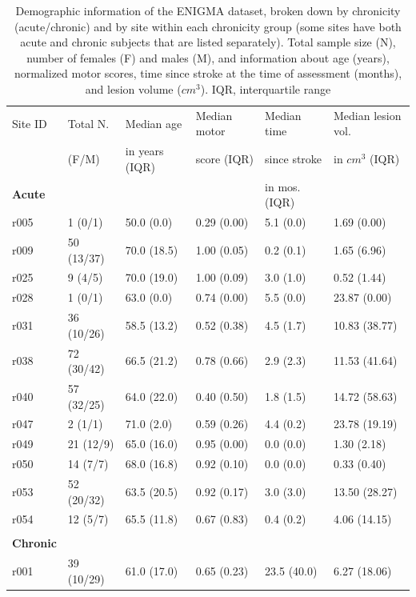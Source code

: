 \documentclass[10pt]{article}
\begin{document}
\newpage
\begin{table}[h]
\centering
\caption{Demographic information of the ENIGMA dataset, broken down by chronicity (acute/chronic) and by site within each chronicity group (some sites have both acute and chronic subjects that are listed separately). Total sample size (N), number of females (F) and males (M), and information about age (years), normalized motor scores, time since stroke at the time of assessment (months), and lesion volume ($cm^3$). IQR, interquartile range}

\label{table:Demographics}
\begin{tabular}{llllll}
\toprule
Site ID & Total N. & Median age & Median motor  & Median time    & Median lesion vol. \\
& (F/M) & in years (IQR) & score (IQR) &  since stroke  & in $cm^3$ (IQR) \\
 \textbf{Acute}  & & & & in mos. (IQR) & \\
\midrule
r005 & 1 (0/1) & 50.0 (0.0) & 0.29 (0.00) & 5.1 (0.0) & 1.69 (0.00) \\
r009 & 50 (13/37) & 70.0 (18.5) & 1.00 (0.05) & 0.2 (0.1) & 1.65 (6.96) \\
r025 & 9 (4/5) & 70.0 (19.0) & 1.00 (0.09) & 3.0 (1.0) & 0.52 (1.44) \\
r028 & 1 (0/1) & 63.0 (0.0) & 0.74 (0.00) & 5.5 (0.0) & 23.87 (0.00) \\
r031 & 36 (10/26) & 58.5 (13.2) & 0.52 (0.38) & 4.5 (1.7) & 10.83 (38.77) \\
r038 & 72 (30/42) & 66.5 (21.2) & 0.78 (0.66) & 2.9 (2.3) & 11.53 (41.64) \\
r040 & 57 (32/25) & 64.0 (22.0) & 0.40 (0.50) & 1.8 (1.5) & 14.72 (58.63) \\
r047 & 2 (1/1) & 71.0 (2.0) & 0.59 (0.26) & 4.4 (0.2) & 23.78 (19.19) \\
r049 & 21 (12/9) & 65.0 (16.0) & 0.95 (0.00) & 0.0 (0.0) & 1.30 (2.18) \\
r050 & 14 (7/7) & 68.0 (16.8) & 0.92 (0.10) & 0.0 (0.0) & 0.33 (0.40) \\
r053 & 52 (20/32) & 63.5 (20.5) & 0.92 (0.17) & 3.0 (3.0) & 13.50 (28.27) \\
r054 & 12 (5/7) & 65.5 (11.8) & 0.67 (0.83) & 0.4 (0.2) & 4.06 (14.15) \\
 & & & & &\\
\textbf{Chronic}  & & & & &\\
\midrule
r001 & 39 (10/29) & 61.0 (17.0) & 0.65 (0.23) & 23.5 (40.0) & 6.27 (18.06) \\

\end{tabular}
\end{table}
\end{document}
